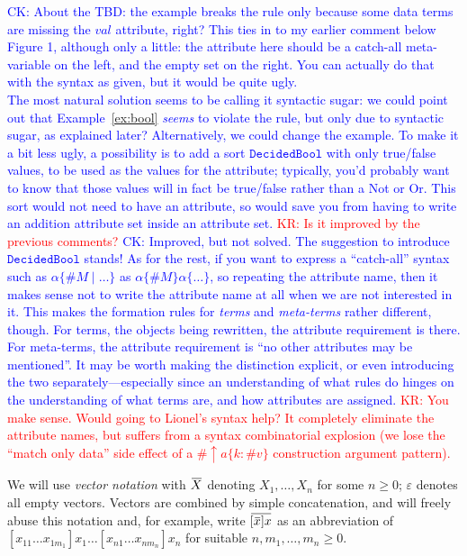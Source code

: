\documentclass[letterpaper,11pt]{article}
\newcommand{\CK}[1]{\textcolor{blue}{CK: #1}}
\newcommand{\KR}[1]{\textcolor{red}{KR: #1}}
\begin{document}
\CK{About the TBD: the example breaks the rule only because some data terms are
missing the $\mathit{val}$ attribute, right?  This ties in to my earlier
comment below Figure 1, although only a little: the attribute here should be a
catch-all meta-variable on the left, and the empty set on the right.  You can
actually do that with the syntax as given, but it would be quite ugly. \\
The most natural solution seems to be calling it syntactic sugar: we could
point out that Example~\ref{ex:bool} \emph{seems} to violate the rule, but
only due to syntactic sugar, as explained later?  Alternatively, we could
change the example.  To make it a bit less ugly, a possibility is to add a
sort $\mathtt{DecidedBool}$ with only true/false values, to be used as the
values for the attribute; typically, you'd probably want to know that those
values will in fact be true/false rather than a Not or Or.  This sort would
not need to have an attribute, so would save you from having to write an
addition attribute set inside an attribute set.}
\KR{Is it improved by the previous comments?}
\CK{Improved, but not solved.  The suggestion to introduce
$\mathtt{DecidedBool}$ stands!  As for the rest, if you want to express a
``catch-all'' syntax such as $\alpha\{\#M \mid \dots\}$ as $\alpha\{\#M\}
\alpha\{\dots\}$, so repeating the attribute name, then it makes sense not
to write the attribute name at all when we are not interested in it.  This
makes the formation rules for \emph{terms} and \emph{meta-terms} rather
different, though.  For terms, the objects being rewritten, the attribute
requirement is there.  For meta-terms, the attribute requirement is ``no
other attributes may be mentioned''.  It may be worth making the distinction
explicit, or even introducing the two separately---especially since an
understanding of what rules do hinges on the understanding of what terms are,
and how attributes are assigned.}
\KR{You make sense. Would going to Lionel's syntax help? It completely eliminate the attribute
  names, but suffers from a syntax combinatorial explosion (we lose the ``match only data'' side
  effect of a $\#↑a\{k:\#v\}$ construction argument pattern).}

\begin{notation}[vectors]
  We will use \emph{vector notation} with $\ov{X}$ denoting $X_1,…,X_n$ for some $n≥0$; $ε$ denotes
  all empty vectors. Vectors are combined by simple concatenation, and will freely abuse this
  notation and, for example, write $\ov{[\ov{x}]x}$ as an abbreviation of
  $[x_{11}…x_{1m_1}]x_1…[x_{n1}…x_{nm_n}]x_n$ for suitable $n,m_1,…,m_n ≥ 0$.
\end{notation}
\end{document}
